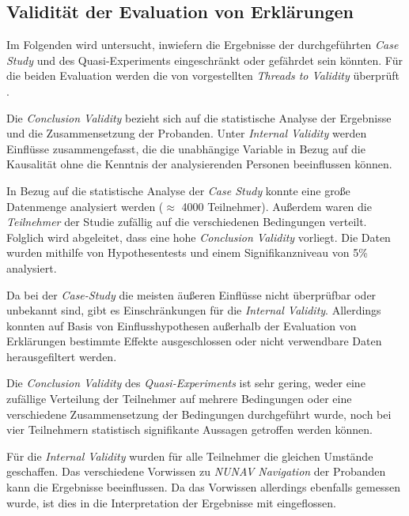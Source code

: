 \subsection{Validität der Evaluation von Erklärungen}

Im Folgenden wird untersucht, inwiefern die Ergebnisse der durchgeführten \textit{Case Study} und des Quasi-Experiments eingeschränkt oder gefährdet sein könnten. Für die beiden Evaluation werden die von \citeauthor{wohlin2012experimentation} vorgestellten \textit{Threads to Validity} überprüft \cite{wohlin2012experimentation}.

Die \textit{Conclusion Validity} bezieht sich auf die statistische Analyse der Ergebnisse und die Zusammensetzung der Probanden. Unter \textit{Internal Validity} werden Einflüsse zusammengefasst, die die unabhängige Variable in Bezug auf die Kausalität ohne die Kenntnis der analysierenden Personen beeinflussen können.

In Bezug auf die statistische Analyse der \textit{Case Study} konnte eine große Datenmenge analysiert werden ($\approx$ 4000 Teilnehmer). Außerdem waren die \textit{Teilnehmer} der Studie zufällig auf die verschiedenen Bedingungen verteilt. Folglich wird abgeleitet, dass eine hohe \textit{Conclusion Validity} vorliegt. Die Daten wurden mithilfe von Hypothesentests und einem Signifikanzniveau von 5\% analysiert.

Da bei der \textit{Case-Study} die meisten äußeren Einflüsse nicht überprüfbar oder unbekannt sind, gibt es Einschränkungen für die \textit{Internal Validity}. Allerdings konnten auf Basis von Einflusshypothesen außerhalb der Evaluation von Erklärungen bestimmte Effekte ausgeschlossen oder nicht verwendbare Daten herausgefiltert werden.

\smallskip

Die \textit{Conclusion Validity} des \textit{Quasi-Experiments} ist sehr gering, weder eine zufällige Verteilung der Teilnehmer auf mehrere Bedingungen oder eine verschiedene Zusammensetzung der Bedingungen durchgeführt wurde, noch bei vier Teilnehmern statistisch signifikante Aussagen getroffen werden können.

Für die \textit{Internal Validity} wurden für alle Teilnehmer die gleichen Umstände geschaffen. Das verschiedene Vorwissen zu \textit{NUNAV Navigation} der Probanden kann die Ergebnisse beeinflussen. Da das Vorwissen allerdings ebenfalls gemessen wurde, ist dies in die Interpretation der Ergebnisse mit eingeflossen.

\smallskip

